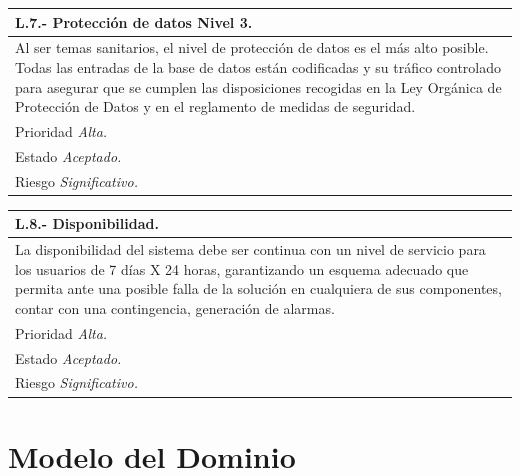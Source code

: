 \documentclass[a4paper,oneside,11pt]{book}
\begin{document}
\begin{center}
\begin{tabulary}{15cm}{|L|}
	\hline
		\bf{L.7.- Protección de datos Nivel 3.} \\
	\hline
		Al ser temas sanitarios, el nivel de protección de datos es el más alto posible. Todas las entradas de la base de datos están codificadas y su tráfico controlado para asegurar que se cumplen las disposiciones recogidas en la Ley Orgánica de Protección de Datos y en el reglamento de medidas de seguridad. \\
	\hline
		Prioridad \textit{Alta.} \\
	\hline
		Estado \textit{Aceptado.} \\
	\hline
		Riesgo \textit{Significativo.} \\
	\hline
\end{tabulary}
\end{center}

\begin{center}
\begin{tabulary}{15cm}{|L|}
	\hline
		\bf{L.8.- Disponibilidad.} \\
	\hline
		La disponibilidad del sistema debe ser continua con un nivel de servicio para los usuarios de 7 días X 24 horas, garantizando un esquema adecuado que permita ante una posible falla de la solución en cualquiera de sus componentes, contar con una contingencia, generación de alarmas. \\
	\hline
		Prioridad \textit{Alta.} \\
	\hline
		Estado \textit{Aceptado.} \\
	\hline
		Riesgo \textit{Significativo.} \\
	\hline
\end{tabulary}
\end{center}



\section{Modelo del Dominio}
\end{document}

